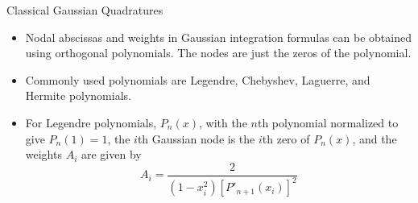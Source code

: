 \documentclass{beamer}
\newcommand{\beforeverb}{\footnotesize}
\newcommand{\afterverb}{\normalsize}
\begin{document}
\begin{frame}{Classical Gaussian Quadratures}
\begin{itemize}
\item Nodal abscissas and weights in Gaussian integration formulas can be obtained using \alert{orthogonal polynomials}. The nodes are just the zeros of the polynomial.
\item Commonly used polynomials are Legendre, Chebyshev, Laguerre, and Hermite polynomials.
\item For Legendre polynomials, $P_n(x)$, with the $n$th polynomial normalized to give $P_n(1)=1$, the $i$th Gaussian node is the $i$th zero of $P_n(x)$, and the weights $A_i$ are given by
\beforeverb
\[
A_i=\frac{2}{(1-x_i^2)[P'_{n+1}(x_i)]^2}
\]
\afterverb
\end{itemize}
\end{frame}
\end{document}
